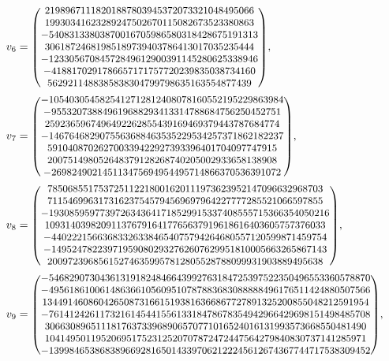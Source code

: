 \documentclass[pdftex]{sigma}
\numberwithin{equation}{section}
\begin{document}
\begin{align*}
&v_{6} =\text{\small $\begin{pmatrix}21989671118201887803945372073321048495066\\ 19930341623289247502670115082673523380863\\ -54083133803870016705986580318428675191313\\ 30618724681985189739403786413017035235444\\ -12330567084572849612900391145280625338946\\ -4188170291786657171757720239835038734160\\ 5629211488385838304799798635163554877439\end{pmatrix}$},\\
&v_{7} =\text{\small $\begin{pmatrix}-1054030545825412712812408078160552195229863984\\ -955320738849619688293413314788684756250452751\\ 2592365967496492262855439169469379443787684774\\ -1467646829075563688463535229534257371862182237\\ 591040870262700339422927393396401704097747915\\ 200751498052648379128268740205002933658138908\\ -269824902145113475694954495714866370536391072\end{pmatrix}$},\\
&v_{8} =\text{\small $\begin{pmatrix}785068551753725112218001620111973623952147096632968703\\ 711546996317316237545794569697964227777285521066597855\\ -1930859597739726343641718529915337408555715366354050216\\ 1093140398209113767916417765637919618616403605757376033\\ -440222156636833263384654075794264680557120599871459754\\ -149524782239719590802932762607629951810005663265867143\\ 200972396856152746359957812805528788099931903889495638\end{pmatrix}$},\\
&v_{9} =\text{\small $\begin{pmatrix}-546829073043613191824846643992763184725397522350496553360578870\\ -495618610061486366105609510787883683088888496176511424880507566\\ 1344914608604265087316615193816366867727891325200855048212591954\\ -761412426117321614544155613318478678354942966429698151498485708\\ 306630896511181763733968906570771016524016131993573668550481490\\ 104149501195206951752312520707872472447564279840830737141285971\\ -139984653868389669281650143397062122245612674367744717538309452\end{pmatrix}$},\\

\end{align*}
\end{document}
